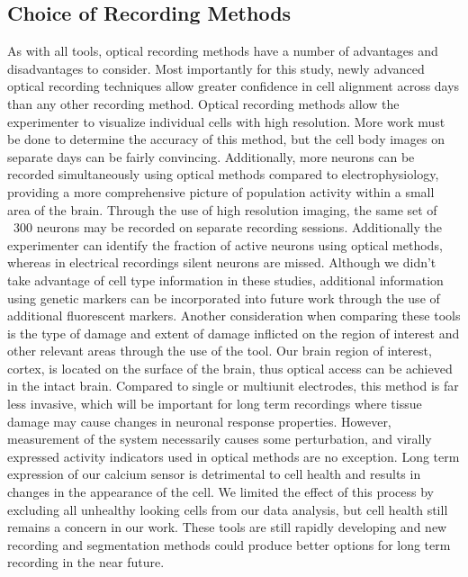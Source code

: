 \subsection{Choice of Recording Methods}
As with all tools, optical recording methods have a number of advantages and disadvantages to consider. Most importantly for this study, newly advanced optical recording techniques allow greater confidence in cell alignment across days than any other recording method. Optical recording methods allow the experimenter to visualize individual cells with high resolution. More work must be done to determine the accuracy of this method, but the cell body images on separate days can be fairly convincing. Additionally, more neurons can be recorded simultaneously using optical methods compared to electrophysiology, providing a more comprehensive picture of population activity within a small area of the brain. Through the use of high resolution imaging, the same set of ~300 neurons may be recorded on separate recording sessions. Additionally the experimenter can identify the fraction of active neurons using optical methods, whereas in electrical recordings silent neurons are missed. Although we didn't take advantage of cell type information in these studies, additional information using genetic markers can be incorporated into future work through the use of additional fluorescent markers. Another consideration when comparing these tools is the type of damage and extent of damage inflicted on the region of interest and other relevant areas through the use of the tool. Our brain region of interest, cortex, is located on the surface of the brain, thus optical access can be achieved in the intact brain. Compared to single or multiunit electrodes, this method is far less invasive, which will be important for long term recordings where tissue damage may cause changes in neuronal response properties. However, measurement of the system necessarily causes some perturbation, and virally expressed activity indicators used in optical methods are no exception. Long term expression of our calcium sensor is detrimental to cell health and results in changes in the appearance of the cell. We limited the effect of this process by excluding all unhealthy looking cells from our data analysis, but cell health still remains a concern in our work. These tools are still rapidly developing and new recording and segmentation methods could produce better options for long term recording in the near future.

